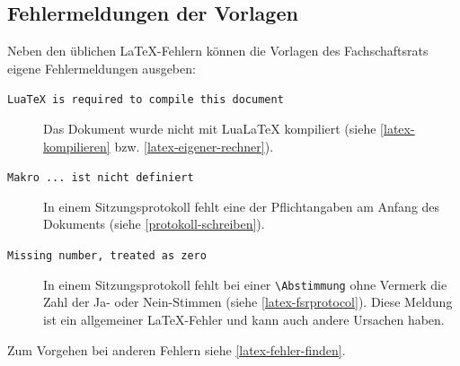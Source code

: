 \subsection{Fehlermeldungen der Vorlagen}
\label{latex-fehlermeldungen}
Neben den üblichen \LaTeX{}-Fehlern können die Vorlagen des Fachschaftsrats eigene Fehlermeldungen ausgeben:
\begin{description}
	\item[\texttt{LuaTeX is required to compile this document}] Das Dokument wurde nicht mit LuaLaTeX kompiliert (siehe \autoref{latex-kompilieren} bzw. \autoref{latex-eigener-rechner}).
	\item[\texttt{Makro ... ist nicht definiert}] In einem Sitzungsprotokoll fehlt eine der Pflichtangaben am Anfang des Dokuments (siehe \autoref{protokoll-schreiben}).
	\item[\texttt{Missing number, treated as zero}] In einem Sitzungsprotokoll fehlt bei einer \texttt{\textbackslash Abstimmung} ohne Vermerk die Zahl der Ja- oder Nein-Stimmen (siehe \autoref{latex-fsrprotocol}). Diese Meldung ist ein allgemeiner \LaTeX{}-Fehler und kann auch andere Ursachen haben.
\end{description}

Zum Vorgehen bei anderen Fehlern siehe \autoref{latex-fehler-finden}.
